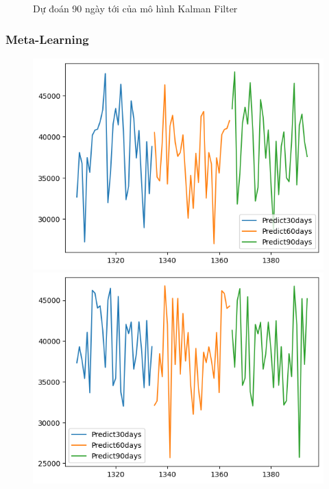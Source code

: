 \begin{figure}[H]
\begin{minipage}{0.15\textwidth}
    \end{minipage}
    \hfill
    
    \caption{Dự đoán 90 ngày tới của mô hình Kalman Filter}
    \label{fig:kalman_filter_30days}
\end{figure}



\subsubsection{Meta-Learning}
\begin{figure}[H]
    \centering
    \begin{minipage}{0.15\textwidth}
    \centering
    \includegraphics[width=1\textwidth]{resources/chapter-5/newdata1/predicted/BIDV_ML_7_3_30days.png}
    \end{minipage}
    \hfill
    \begin{minipage}{0.15\textwidth}
    \centering
    \includegraphics[width=1\textwidth]{resources/chapter-5/newdata1/predicted/BIDV_ML_8_2_30days.png}

\end{minipage}
\end{figure}
